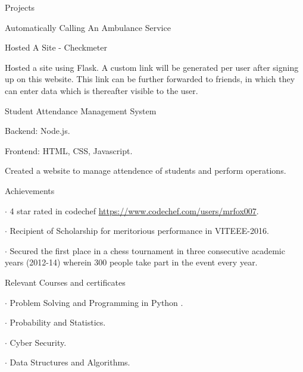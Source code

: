 \documentclass{resume} %
\begin{document}
\begin{rSection}{Projects}
\begin{rSubsection}{ Automatically Calling An Ambulance Service}{}{}
\end{rSubsection}


\begin{rSubsection}{ Hosted A Site - Checkmeter}{}{}

\item Hosted a site using Flask. A custom link will be generated per user after signing up on this website. This link can be further forwarded to friends, in which they can enter data which is thereafter visible to the user.

\end{rSubsection}

\begin{rSubsection}{ Student Attendance Management System}{}{}

    \item Backend: Node.js.
    \item Frontend: HTML, CSS, Javascript.
    \item Created a website to manage attendence of students and perform operations.

\end{rSubsection}

\end{rSection}



\begin{rSection}{Achievements} \itemsep -5pt
    \item $\cdot$ 4 star rated in codechef \url{https://www.codechef.com/users/mrfox007}.
    \item $\cdot$ Recipient of Scholarship for meritorious performance in VITEEE-2016.
    \item $\cdot$ Secured the first place in a chess tournament in three consecutive academic years (2012-14) wherein \phantom{x} 300 people take part in the event every year.
\end{rSection}

\begin{rSection}{Relevant Courses and certificates} \itemsep -4pt \topmargin -50pt
    \item $\cdot$ Problem Solving and Programming in Python .
    \item $\cdot$ Probability and Statistics.
    \item $\cdot$ Cyber Security.
    \item $\cdot$ Data Structures and Algorithms.
\end{rSection}
\end{document}
